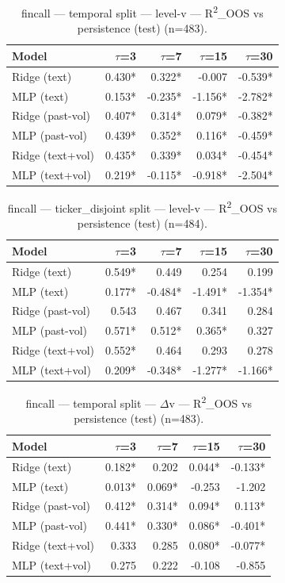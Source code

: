 
\begin{table}[t]
\centering
\begin{tabular}{lrrrr}
\toprule
Model & $\tau$=3 & $\tau$=7 & $\tau$=15 & $\tau$=30 \\
\midrule
Ridge (text) & 0.430* & 0.322* & -0.007 & -0.539* \\
MLP (text) & 0.153* & -0.235* & -1.156* & -2.782* \\
Ridge (past-vol) & 0.407* & 0.314* & 0.079* & -0.382* \\
MLP (past-vol) & 0.439* & 0.352* & 0.116* & -0.459* \\
Ridge (text+vol) & 0.435* & 0.339* & 0.034* & -0.454* \\
MLP (text+vol) & 0.219* & -0.115* & -0.918* & -2.504* \\
\bottomrule
\end{tabular}
\caption{fincall — temporal split — level-v — R\textsuperscript{2}\_OOS vs persistence (test) (n=483).}
\end{table}

\begin{table}[t]
\centering
\begin{tabular}{lrrrr}
\toprule
Model & $\tau$=3 & $\tau$=7 & $\tau$=15 & $\tau$=30 \\
\midrule
Ridge (text) & 0.549* & 0.449 & 0.254 & 0.199 \\
MLP (text) & 0.177* & -0.484* & -1.491* & -1.354* \\
Ridge (past-vol) & 0.543 & 0.467 & 0.341 & 0.284 \\
MLP (past-vol) & 0.571* & 0.512* & 0.365* & 0.327 \\
Ridge (text+vol) & 0.552* & 0.464 & 0.293 & 0.278 \\
MLP (text+vol) & 0.209* & -0.348* & -1.277* & -1.166* \\
\bottomrule
\end{tabular}
\caption{fincall — ticker\_disjoint split — level-v — R\textsuperscript{2}\_OOS vs persistence (test) (n=484).}
\end{table}

\begin{table}[t]
\centering
\begin{tabular}{lrrrr}
\toprule
Model & $\tau$=3 & $\tau$=7 & $\tau$=15 & $\tau$=30 \\
\midrule
Ridge (text) & 0.182* & 0.202 & 0.044* & -0.133* \\
MLP (text) & 0.013* & 0.069* & -0.253 & -1.202 \\
Ridge (past-vol) & 0.412* & 0.314* & 0.094* & 0.113* \\
MLP (past-vol) & 0.441* & 0.330* & 0.086* & -0.401* \\
Ridge (text+vol) & 0.333 & 0.285 & 0.080* & -0.077* \\
MLP (text+vol) & 0.275 & 0.222 & -0.108 & -0.855 \\
\bottomrule
\end{tabular}
\caption{fincall — temporal split — $\Delta$v — R\textsuperscript{2}\_OOS vs persistence (test) (n=483).}
\end{table}

